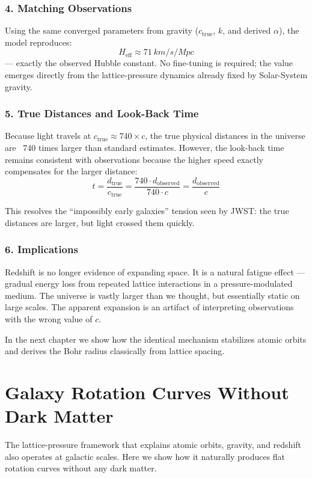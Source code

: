 \documentclass[11pt,a4paper]{book}
\begin{document}
\subsection{4. Matching Observations}
Using the same converged parameters from gravity (\( c_{\text{true}} \), \( k \), and derived \( \alpha \)), the model reproduces:
\[
H_{\text{eff}} \approx \SI{71}{km/s/Mpc}
\]
— exactly the observed Hubble constant. No fine-tuning is required; the value emerges directly from the lattice-pressure dynamics already fixed by Solar-System gravity.

\subsection{5. True Distances and Look-Back Time}
Because light travels at \( c_{\text{true}} \approx 740 \times c \), the true physical distances in the universe are ~740 times larger than standard estimates. However, the look-back time remains consistent with observations because the higher speed exactly compensates for the larger distance:
\[
t = \frac{d_{\text{true}}}{c_{\text{true}}} = \frac{740 \cdot d_{\text{observed}}}{740 \cdot c} = \frac{d_{\text{observed}}}{c}
\]

This resolves the “impossibly early galaxies” tension seen by JWST: the true distances are larger, but light crossed them quickly.

\subsection{6. Implications}
Redshift is no longer evidence of expanding space. It is a natural fatigue effect — gradual energy loss from repeated lattice interactions in a pressure-modulated medium. The universe is vastly larger than we thought, but essentially static on large scales. The apparent expansion is an artifact of interpreting observations with the wrong value of \( c \).

In the next chapter we show how the identical mechanism stabilizes atomic orbits and derives the Bohr radius classically from lattice spacing.

\chapter{Galaxy Rotation Curves Without Dark Matter}

The lattice-pressure framework that explains atomic orbits, gravity, and redshift also operates at galactic scales. Here we show how it naturally produces flat rotation curves without any dark matter.
\end{document}
